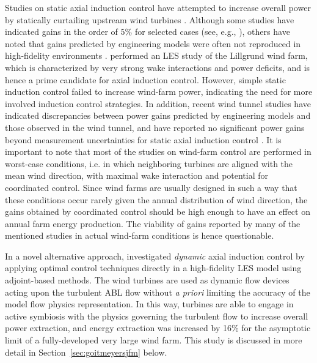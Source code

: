 Studies on static axial induction control have attempted to increase overall power by statically curtailing upstream wind turbines \citep{knudsen2015survey}. Although some studies have indicated gains in the order of $5\%$ for selected cases (see, e.g., \citealp{horvat2012quasi, johnson2012assessment, gebraad2015maximum, vali2017adjoint}), others have noted that gains predicted by engineering models were often not reproduced in high-fidelity environments \citep{annoni2016analysis}. \cite{nilsson2015large} performed an LES study of the Lillgrund wind farm, which is characterized by very strong wake interactions and power deficits, and is hence a prime candidate for axial induction control. However, simple static induction control failed to increase wind-farm power, indicating the need for more involved induction control strategies. In addition, recent wind tunnel studies have indicated discrepancies between power gains predicted by engineering models and those observed in the wind tunnel, and have reported no significant power gains beyond measurement uncertainties for static axial induction control  \citep{campagnolo2016wind, bartl2016experimental}. It is important to note that most of the studies on wind-farm control are performed in worst-case conditions, i.e. in which neighboring turbines are aligned with the mean wind direction, with maximal wake interaction and potential for coordinated control. Since wind farms are usually designed in such a way that these conditions occur rarely given the annual distribution of wind direction, the gains obtained by coordinated control should be high enough to have an effect on annual farm energy production. The viability of gains reported by many of the mentioned studies in actual wind-farm conditions is hence questionable.  

In a novel alternative approach, \cite{goit2015optimal} investigated \emph{dynamic} axial induction control by applying optimal control techniques directly in a high-fidelity LES model using adjoint-based methods. The wind turbines are used as dynamic flow devices acting upon the turbulent ABL flow without \emph{a priori} limiting the accuracy of the model flow physics representation. In this way, turbines are able to engage in active symbiosis with the physics governing the turbulent flow to increase overall power extraction, and energy extraction was increased by 16\% for the asymptotic limit of a fully-developed very large wind farm. This study is discussed in more detail in Section~\ref{sec:goitmeyersjfm} below.

